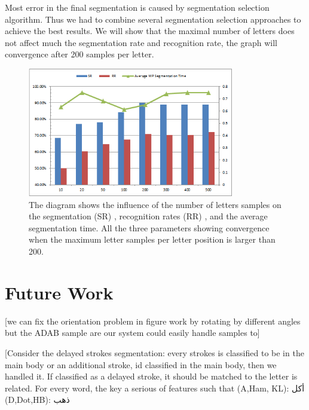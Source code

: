 \documentclass[12pt,journal,compsoc]{IEEEtran}
\begin{document}
Most error in the final segmentation is caused by segmentation selection algorithm. Thus we had to combine several segmentation selection approaches to achieve the best results.
We will show that the maximal number of letters does not affect much the segmentation rate and recognition rate, the graph will convergence after 200 samples per letter.

\begin{figure}[h]
\centering
\includegraphics[width=9cm]{./figures/num_letter_impact}
\caption{The diagram shows the influence of the number of letters samples on the segmentation (SR) , recognition rates (RR) , and the average segmentation time. All the three parameters showing convergence when the maximum letter samples per letter position is larger than 200. }
\label{fig:num_letter_impact}
\end{figure}


\section{Future Work}
[we can fix the orientation problem in figure work by rotating by different angles but the ADAB sample are our system could easily handle samples to]

[Consider the delayed strokes segmentation: every strokes is classified to be in the main body or an additional stroke, id classified in the main body, then we handled it. If classified as a delayed stroke, it should be matched to the letter is related.
For every word, the key a serious of features such that
(A,Ham, KL): أكل
(D,Dot,HB): ذهب




\end{document}
